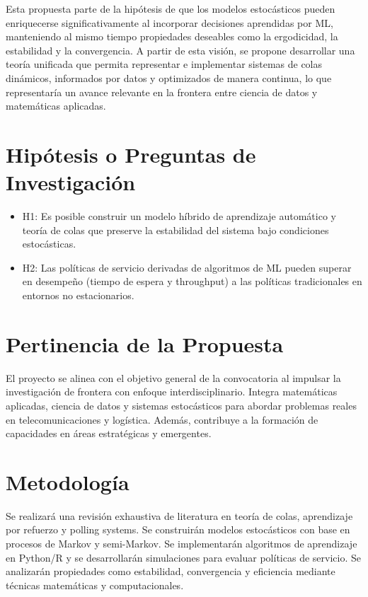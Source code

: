 \documentclass[12pt]{article}
\begin{document}
Esta propuesta parte de la hipótesis de que los modelos estocásticos pueden enriquecerse significativamente al incorporar decisiones aprendidas por ML, manteniendo al mismo tiempo propiedades deseables como la ergodicidad, la estabilidad y la convergencia. A partir de esta visión, se propone desarrollar una teoría unificada que permita representar e implementar sistemas de colas dinámicos, informados por datos y optimizados de manera continua, lo que representaría un avance relevante en la frontera entre ciencia de datos y matemáticas aplicadas.

\section{Hipótesis o Preguntas de Investigación}
\begin{itemize}
  \item H1: Es posible construir un modelo híbrido de aprendizaje automático y teoría de colas que preserve la estabilidad del sistema bajo condiciones estocásticas.
  \item H2: Las políticas de servicio derivadas de algoritmos de ML pueden superar en desempeño (tiempo de espera y throughput) a las políticas tradicionales en entornos no estacionarios.
\end{itemize}

\section{Pertinencia de la Propuesta}
El proyecto se alinea con el objetivo general de la convocatoria al impulsar la investigación de frontera con enfoque interdisciplinario. Integra matemáticas aplicadas, ciencia de datos y sistemas estocásticos para abordar problemas reales en telecomunicaciones y logística. Además, contribuye a la formación de capacidades en áreas estratégicas y emergentes.

\section{Metodología}
Se realizará una revisión exhaustiva de literatura en teoría de colas, aprendizaje por refuerzo y polling systems. Se construirán modelos estocásticos con base en procesos de Markov y semi-Markov. Se implementarán algoritmos de aprendizaje en Python/R y se desarrollarán simulaciones para evaluar políticas de servicio. Se analizarán propiedades como estabilidad, convergencia y eficiencia mediante técnicas matemáticas y computacionales.
\end{document}
